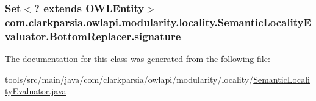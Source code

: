 \hypertarget{classcom_1_1clarkparsia_1_1owlapi_1_1modularity_1_1locality_1_1_semantic_locality_evaluator_1_1_bottom_replacer_a84126f5039ec4144901c63d482539281}{
\subsubsection[{signature}]{\setlength{\rightskip}{0pt plus 5cm}Set$<$? extends {\bf O\-W\-L\-Entity}$>$ com.\-clarkparsia.\-owlapi.\-modularity.\-locality.\-Semantic\-Locality\-Evaluator.\-Bottom\-Replacer.\-signature\hspace{0.3cm}{\ttfamily [private]}}}\label{classcom_1_1clarkparsia_1_1owlapi_1_1modularity_1_1locality_1_1_semantic_locality_evaluator_1_1_bottom_replacer_a84126f5039ec4144901c63d482539281}


The documentation for this class was generated from the following file\-:\begin{DoxyCompactItemize}
\item 
tools/src/main/java/com/clarkparsia/owlapi/modularity/locality/\hyperlink{_semantic_locality_evaluator_8java}{Semantic\-Locality\-Evaluator.\-java}\end{DoxyCompactItemize}
